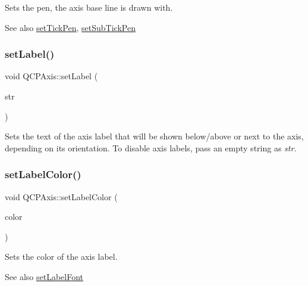 Sets the pen, the axis base line is drawn with.

\begin{DoxySeeAlso}{See also}
\mbox{\hyperlink{class_q_c_p_axis_ad80923bcc1c5da4c4db602c5325e797e}{set\+Tick\+Pen}}, \mbox{\hyperlink{class_q_c_p_axis_aede4028ae7516bd51a60618a8233f9cf}{set\+Sub\+Tick\+Pen}} 
\end{DoxySeeAlso}
\mbox{\label{class_q_c_p_axis_a33bcc382c111c9f31bb0687352a2dea4}} 
\subsubsection{\texorpdfstring{setLabel()}{setLabel()}}
{\footnotesize\ttfamily void Q\+C\+P\+Axis\+::set\+Label (\begin{DoxyParamCaption}\item[{const Q\+String \&}]{str }\end{DoxyParamCaption})}

Sets the text of the axis label that will be shown below/above or next to the axis, depending on its orientation. To disable axis labels, pass an empty string as {\itshape str}. \mbox{\label{class_q_c_p_axis_a6c906fe56d75f0122335b9f79b999608}} 
\subsubsection{\texorpdfstring{setLabelColor()}{setLabelColor()}}
{\footnotesize\ttfamily void Q\+C\+P\+Axis\+::set\+Label\+Color (\begin{DoxyParamCaption}\item[{const Q\+Color \&}]{color }\end{DoxyParamCaption})}

Sets the color of the axis label.

\begin{DoxySeeAlso}{See also}
\mbox{\hyperlink{class_q_c_p_axis_a71ac1a47f7547e490a8c4311d1433cf3}{set\+Label\+Font}} 
\end{DoxySeeAlso}
\mbox{\label{class_q_c_p_axis_a71ac1a47f7547e490a8c4311d1433cf3}} 
